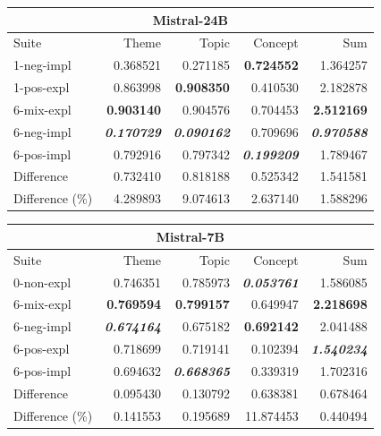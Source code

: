 \begin{table}
    \quad    
    \begin{tabular}{lrrrr}
    \toprule
    \multicolumn{5}{c}{\textbf{Mistral-24B}} \\
    \midrule
    Suite & Theme & Topic & Concept & Sum \\
    1-neg-impl & 0.368521 & 0.271185 & \bfseries 0.724552 & 1.364257 \\
    1-pos-expl & 0.863998 & \bfseries 0.908350 & 0.410530 & 2.182878 \\
    6-mix-expl & \bfseries 0.903140 & 0.904576 & 0.704453 & \bfseries 2.512169 \\
    6-neg-impl & \bfseries \itshape 0.170729 & \bfseries \itshape 0.090162 & 0.709696 & \bfseries \itshape 0.970588 \\
    6-pos-impl & 0.792916 & 0.797342 & \bfseries \itshape 0.199209 & 1.789467 \\
    \midrule
    Difference & 0.732410 & 0.818188 & 0.525342 & 1.541581 \\
    Difference (\%) & 4.289893 & 9.074613 & 2.637140 & 1.588296 \\
    \bottomrule
    \end{tabular}
    \quad %
    \begin{tabular}{lrrrr}
    \toprule
    \multicolumn{5}{c}{\textbf{Mistral-7B}} \\
    \midrule
    Suite & Theme & Topic & Concept & Sum \\
    0-non-expl & 0.746351 & 0.785973 & \bfseries \itshape 0.053761 & 1.586085 \\
    6-mix-expl & \bfseries 0.769594 & \bfseries 0.799157 & 0.649947 & \bfseries 2.218698 \\
    6-neg-impl & \bfseries \itshape 0.674164 & 0.675182 & \bfseries 0.692142 & 2.041488 \\
    6-pos-expl & 0.718699 & 0.719141 & 0.102394 & \bfseries \itshape 1.540234 \\
    6-pos-impl & 0.694632 & \bfseries \itshape 0.668365 & 0.339319 & 1.702316 \\
    \midrule
    Difference & 0.095430 & 0.130792 & 0.638381 & 0.678464 \\
    Difference (\%) & 0.141553 & 0.195689 & 11.874453 & 0.440494 \\
    \bottomrule
    \end{tabular}
    

\end{table}
